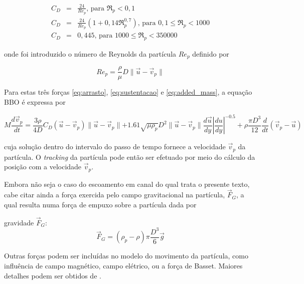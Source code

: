\begin{eqnarray}
	C_D &=& \frac{24}{Re_p}\text{, para }\Re_p< 0,1\nonumber\\
	C_D &=& \frac{24}{Re_p}\left(1+0,14\Re_p^{0,7}\right)\text{, para }0,1\leq\Re_p< 1000\\
	C_D &=& 0,445\text{, para }1000\leq\Re_p< 350000\nonumber
\end{eqnarray}

onde foi introduzido o número de Reynolds da partícula $Re_p$ definido
por

\begin{equation}
	Re_p = \frac{\rho}{\mu}D\parallel\vec{u}-\vec{v}_p\parallel
\end{equation}

Para estas três forças \ref{eq:arrasto}, \ref{eq:sustentacao} e
\ref{eq:added_mass}, a equação BBO é expressa por

\begin{equation}
	M\frac{d\vec{v}_p}{dt} = 
	\frac{3\rho}{4D}C_D(\vec{u}-\vec{v}_p)\parallel\vec{u}-\vec{v}_p\parallel
	+1.61\sqrt{\mu\rho_p}D^2\parallel\vec{u}-\vec{v}_p\parallel\frac{d\vec{u}}{dy}\left|\frac{du}{dy}\right|^{-0.5}
	+\rho\frac{\pi D^3}{12}\frac{d}{dt}(\vec{v}_p-\vec{u})
\end{equation}

cuja solução dentro do intervalo do passo de tempo fornece a velocidade
$\vec{v}_p$ da partícula. O {\it tracking} da partícula pode então ser
efetuado por meio do cálculo da posição com a velocidade $\vec{v}_p$.

Embora não seja o caso do escoamento em canal do qual trata o presente
texto, cabe citar ainda a força exercida pelo campo gravitacional na
partícula, $\vec{F}_G$, a qual resulta numa força de empuxo sobre a
partícula dada por

gravidade $\vec{F}_G$:
\begin{equation}
	\vec{F}_G = (\rho_p-\rho)\pi\frac{D^3}{6}\vec{g}
\end{equation}

Outras forças podem ser incluídas no modelo do movimento da partícula,
como influência de campo magnético, campo elétrico, ou a força de
Basset. Maiores detalhes podem ser obtidos de \citet{crowe2012}.

